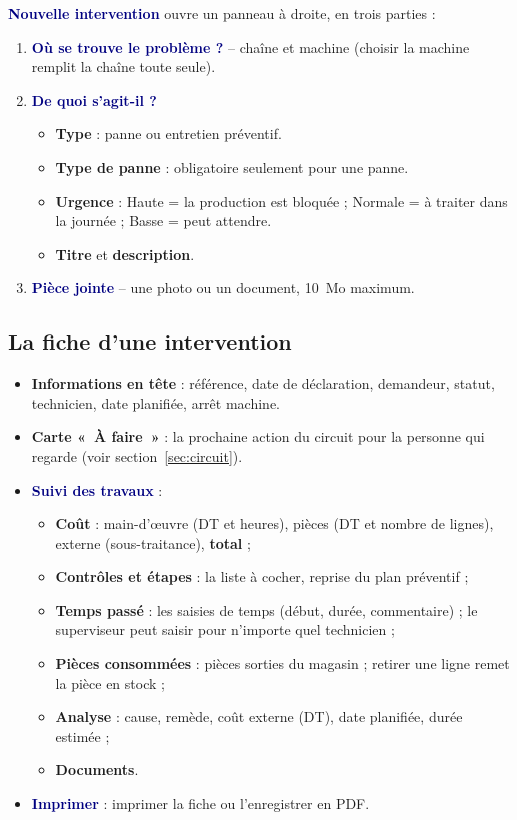 \documentclass[11pt,a4paper]{article}
\newcommand{\ui}[1]{\textbf{\textcolor{navy}{#1}}}          %
\begin{document}
\ui{Nouvelle intervention} ouvre un panneau à droite, en trois parties :
\begin{enumerate}
  \item \ui{Où se trouve le problème ?} -- chaîne et machine (choisir la machine remplit la chaîne toute seule).
  \item \ui{De quoi s'agit-il ?}
    \begin{itemize}
      \item \textbf{Type} : panne ou entretien préventif.
      \item \textbf{Type de panne} : obligatoire seulement pour une panne.
      \item \textbf{Urgence} : Haute = la production est bloquée ; Normale = à traiter dans la journée ; Basse = peut attendre.
      \item \textbf{Titre} et \textbf{description}.
    \end{itemize}
  \item \ui{Pièce jointe} -- une photo ou un document, 10~Mo maximum.
\end{enumerate}

\subsection{La fiche d'une intervention}

\begin{itemize}
  \item \textbf{Informations en tête} : référence, date de déclaration, demandeur, statut, technicien, date planifiée, arrêt machine.
  \item \textbf{Carte «~À faire~»} : la prochaine action du circuit pour la personne qui regarde (voir section~\ref{sec:circuit}).
  \item \ui{Suivi des travaux} :
    \begin{itemize}
      \item \textbf{Coût} : main-d'\oe uvre (DT et heures), pièces (DT et nombre de lignes), externe (sous-traitance), \textbf{total} ;
      \item \textbf{Contrôles et étapes} : la liste à cocher, reprise du plan préventif ;
      \item \textbf{Temps passé} : les saisies de temps (début, durée, commentaire) ; le superviseur peut saisir pour n'importe quel technicien ;
      \item \textbf{Pièces consommées} : pièces sorties du magasin ; retirer une ligne remet la pièce en stock ;
      \item \textbf{Analyse} : cause, remède, coût externe (DT), date planifiée, durée estimée ;
      \item \textbf{Documents}.
    \end{itemize}
  \item \ui{Imprimer} : imprimer la fiche ou l'enregistrer en PDF.
\end{itemize}
\end{document}
